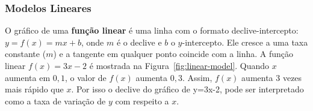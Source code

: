 \subsubsection{Modelos Lineares}
O gráfico de uma \textbf{função linear} é uma linha com o formato declive-intercepto: $y=f(x)=mx+b$, onde $m$ é o declive e $b$ o $y$-intercepto. Ele cresce a uma taxa constante ($m$) e a tangente em qualquer ponto coincide com a linha. A função linear $f(x)=3x-2$ é mostrada na Figura~\ref{fig:linear-model}. Quando $x$ aumenta em $0,1$, o valor de $f(x)$ aumenta $0,3$. Assim, $f(x)$ aumenta 3 vezes mais rápido que $x$. Por isso o declive do gráfico de y=3x-2, pode ser interpretado como a taxa de variação de $y$ com respeito a $x$.
\vspace{-0.5cm}\begin{figure}[!ht]
  \centering
  \caption{}\vspace{-0.5cm}
\end{figure}

